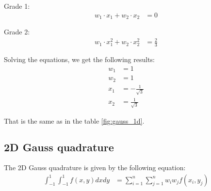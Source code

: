 \documentclass{article}  %
\begin{document}
Grade 1:
\begin{align}
  w_1 \cdot x_1 + w_2 \cdot x_2 &= 0 
\end{align}

Grade 2:
\begin{align}
  w_1 \cdot x_1^2 + w_2 \cdot x_2^2 &= \frac{2}{3} 
\end{align}

Solving the equations, we get the following results:  
\begin{align}
  w_1 &= 1 \\
  w_2 &= 1 \\
  x_1 &= -\frac{1}{\sqrt{3}} \\
  x_2 &= \frac{1}{\sqrt{3}}
\end{align}

That is the same as in the table \ref{fig:gauss_1d}.
\subsection{2D Gauss quadrature}
The 2D Gauss quadrature is given by the following equation:
\begin{align}
  \int_{-1}^{1}\int_{-1}^{1} f(x,y) dx dy & = \sum_{i=1}^{n} \sum_{j=1}^{n} w_i w_j f(x_i,y_j) \\
\end{align}
\end{document}
